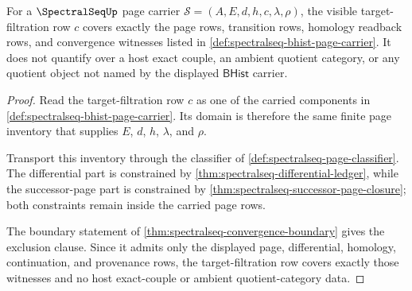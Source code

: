 \begin{theorem}
\label{thm:spectralseq-visible-target-filtration-coverage}
For a $\SpectralSeqUp$ page carrier
$\mathcal S=(A,E,d,h,c,\lambda,\rho)$, the visible target-filtration row $c$
covers exactly the page rows, transition rows, homology readback rows, and
convergence witnesses listed in \autoref{def:spectralseq-bhist-page-carrier}.
It does not quantify over a host exact couple, an ambient quotient category, or
any quotient object not named by the displayed $\mathsf{BHist}$ carrier.
\end{theorem}
\begin{proof}
Read the target-filtration row $c$ as one of the carried components in
\autoref{def:spectralseq-bhist-page-carrier}. Its domain is therefore the same
finite page inventory that supplies $E$, $d$, $h$, $\lambda$, and $\rho$.

Transport this inventory through the classifier of
\autoref{def:spectralseq-page-classifier}. The differential part is constrained
by \autoref{thm:spectralseq-differential-ledger}, while the successor-page part
is constrained by \autoref{thm:spectralseq-successor-page-closure}; both
constraints remain inside the carried page rows.

The boundary statement of \autoref{thm:spectralseq-convergence-boundary} gives
the exclusion clause. Since it admits only the displayed page, differential,
homology, continuation, and provenance rows, the target-filtration row covers
exactly those witnesses and no host exact-couple or ambient quotient-category
data.
\end{proof}

